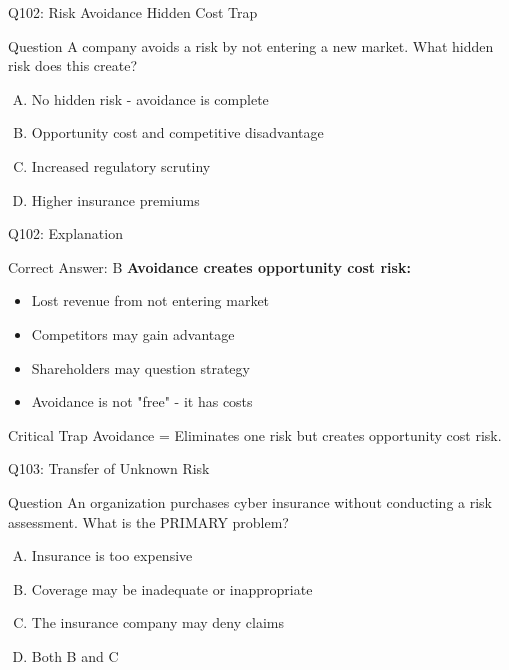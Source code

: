 \documentclass{beamer}
\begin{document}
	\begin{frame}{Q102: Risk Avoidance Hidden Cost Trap}
		\begin{block}{Question}
			A company avoids a risk by not entering a new market. What hidden risk does this create?
		\end{block}
		\begin{enumerate}[(A)]
			\item No hidden risk - avoidance is complete
			\item Opportunity cost and competitive disadvantage
			\item Increased regulatory scrutiny
			\item Higher insurance premiums
		\end{enumerate}
	\end{frame}
	
	\begin{frame}{Q102: Explanation}
		\begin{block}{Correct Answer: B}
			\textbf{Avoidance creates opportunity cost risk:}
			\begin{itemize}
				\item Lost revenue from not entering market
				\item Competitors may gain advantage
				\item Shareholders may question strategy
				\item Avoidance is not "free" - it has costs
			\end{itemize}
		\end{block}
		\begin{alertblock}{Critical Trap}
			Avoidance = Eliminates one risk but creates opportunity cost risk.
		\end{alertblock}
	\end{frame}
	
	\begin{frame}{Q103: Transfer of Unknown Risk}
		\begin{block}{Question}
			An organization purchases cyber insurance without conducting a risk assessment. What is the PRIMARY problem?
		\end{block}
		\begin{enumerate}[(A)]
			\item Insurance is too expensive
			\item Coverage may be inadequate or inappropriate
			\item The insurance company may deny claims
			\item Both B and C
		\end{enumerate}
	\end{frame}
	
\end{document}
